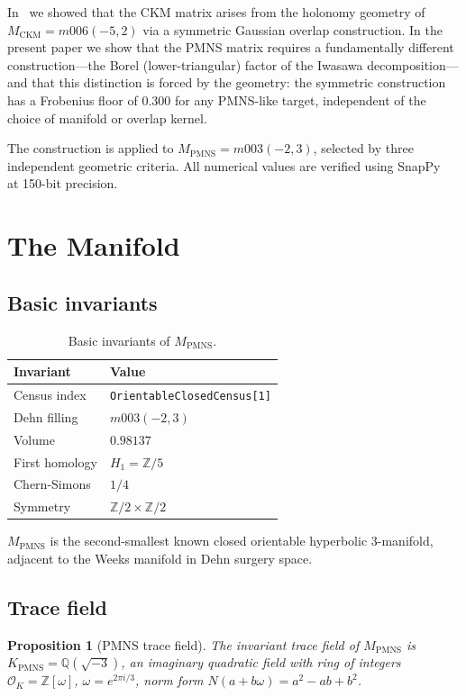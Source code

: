 \documentclass[11pt,a4paper]{article}
\newtheorem{proposition}[theorem]{Proposition}
\theoremstyle{definition}
\newcommand{\MPMNS}{M_{\mathrm{PMNS}}}
\newcommand{\KPMNS}{K_{\mathrm{PMNS}}}
\newcommand{\Zom}{\mathbb{Z}[\omega]}
\newcommand{\Zfive}{\mathbb{Z}/5}
\begin{document}
In~\cite{Gentry:CKM} we showed that the CKM matrix arises from the
holonomy geometry of $M_{\mathrm{CKM}}=m006(-5,2)$ via a symmetric
Gaussian overlap construction. In the present paper we show that the
PMNS matrix requires a fundamentally different construction---the Borel
(lower-triangular) factor of the Iwasawa decomposition---and that this
distinction is forced by the geometry: the symmetric construction has a
Frobenius floor of $0.300$ for any PMNS-like target, independent of
the choice of manifold or overlap kernel.

The construction is applied to $\MPMNS=m003(-2,3)$, selected by
three independent geometric criteria. All numerical values are
verified using SnapPy~\cite{SnapPy} at 150-bit precision.

\section{The Manifold}
\label{sec:manifold}

\subsection{Basic invariants}

\begin{table}[htbp]
\centering
\caption{Basic invariants of $\MPMNS$.}
\begin{tabular}{ll}
\toprule
Invariant & Value \\
\midrule
Census index & \texttt{OrientableClosedCensus[1]} \\
Dehn filling & $m003(-2,3)$ \\
Volume & $0.98137$ \\
First homology & $H_1 = \Zfive$ \\
Chern-Simons & $1/4$ \\
Symmetry & $\mathbb{Z}/2\times\mathbb{Z}/2$ \\
\bottomrule
\end{tabular}
\end{table}

$\MPMNS$ is the second-smallest known closed orientable hyperbolic
3-manifold, adjacent to the Weeks manifold in Dehn surgery space.

\subsection{Trace field}

\begin{proposition}[PMNS trace field]
The invariant trace field of $\MPMNS$ is
$\KPMNS = \mathbb{Q}(\sqrt{-3})$,
an imaginary quadratic field with ring of integers
$\mathcal{O}_K = \Zom$, $\omega = e^{2\pi i/3}$,
norm form $N(a+b\omega) = a^2-ab+b^2$.
\end{proposition}
\end{document}
